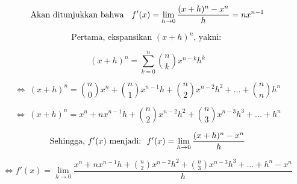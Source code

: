 \documentclass{article}
\begin{document}
\begin{eulernotebook}
\begin{eulercomment}
\begin{eulercomment}
\begin{eulercomment}
\end{eulercomment}
\begin{eulerformula}
\[
\text{Akan ditunjukkan bahwa \: $f'(x)=\lim_{h\to 0} \frac{(x+h)^n-x^n}{h}=nx^{n-1}$}
\]
\end{eulerformula}
\begin{eulercomment}
\end{eulercomment}
\begin{eulerformula}
\[
\text{Pertama, ekspansikan $(x+h)^n$, yakni: }
\]
\end{eulerformula}
\begin{eulercomment}
\end{eulercomment}
\begin{eulerformula}
\[
\text{$(x+h)^n=\sum_{k=0}^{n} \binom{n}{k}x^{n-k}h^k$}
\]
\end{eulerformula}
\begin{eulercomment}
\end{eulercomment}
\begin{eulerformula}
\[
\text{$\Leftrightarrow \: (x+h)^n=\binom{n}{0}x^{n}+\binom{n}{1}x^{n-1}h+\binom{n}{2}x^{n-2}h^2+ ...+\binom{n}{n}h^n$}
\]
\end{eulerformula}
\begin{eulercomment}
\end{eulercomment}
\begin{eulerformula}
\[
\text{$\Leftrightarrow \: (x+h)^n=x^{n}+nx^{n-1}h+\binom{n}{2}x^{n-2}h^2+\binom{n}{3}x^{n-3}h^3+ ...+h^n$}
\]
\end{eulerformula}
\begin{eulercomment}
\end{eulercomment}
\begin{eulerformula}
\[
\text{Sehingga, $f'(x)$ menjadi:\: $f'(x)=\lim_{h\to 0} \frac{(x+h)^n-x^n}{h}$}
\]
\end{eulerformula}
\begin{eulercomment}
\end{eulercomment}
\begin{eulerformula}
\[
\text{$\Leftrightarrow f'(x)=\lim_{h\to 0} \frac{x^{n}+nx^{n-1}h+\binom{n}{2}x^{n-2}h^2+\binom{n}{3}x^{n-3}h^3+ ...+h^n-x^n}{h}$}
\]
\end{eulerformula}
\begin{eulercomment}
\end{eulercomment}
\begin{eulerformula}

\end{eulerformula}
\end{eulercomment}
\end{eulercomment}
\end{eulernotebook}
\end{document}

